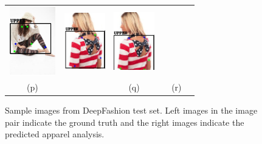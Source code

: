 \documentclass[conference]{IEEEtran}
\begin{document}
\begin{figure}
\begin{tabular} {cccccc}
{\includegraphics[align=c, width = 0.8in, height= 3cm]{images/p_17.PNG}} &
{\includegraphics[align=c, width = 0.7in, height= 3cm]{images/gt_18.png}} &
{\includegraphics[align=c, width = 0.7in, height= 3cm]{images/p_18.png}} \\
(p) &  & (q) & & (r) &\\
\end{tabular}
\caption{Sample images from DeepFashion test set. Left images in the image pair indicate the ground truth and the right images indicate the predicted apparel analysis. }
\label{fig:label12}
\end{figure}
\end{document}
